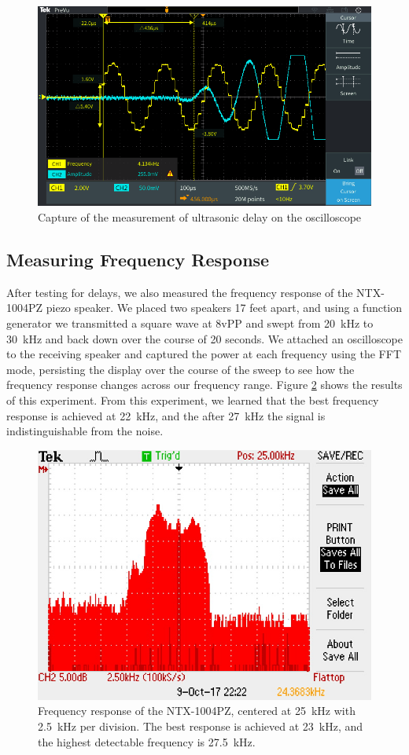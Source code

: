 \documentclass{article}
\begin{document}
    \begin{figure}[H]
      \centering
      \includegraphics[width=0.8\linewidth]{./images/us_delay_scope.png}
      \caption{Capture of the measurement of ultrasonic delay on the oscilloscope}
      \label{fig:us_delay_scope}
    \end{figure}

  \subsection{Measuring Frequency Response} \label{section:frequency_response}

    After testing for delays, we also measured the frequency response of the NTX-1004PZ piezo speaker. We placed two speakers 17 feet apart, and using a function generator we transmitted a square wave at 8vPP and swept from \SI{20}{\kilo\hertz} to \SI{30}{\kilo\hertz} and back down over the course of 20 seconds. We attached an oscilloscope to the receiving speaker and captured the power at each frequency using the FFT mode, persisting the display over the course of the sweep to see how the frequency response changes across our frequency range. Figure \ref{fig:frequency_response} shows the results of this experiment. From this experiment, we learned that the best frequency response is achieved at \SI{22}{\kilo\hertz}, and the after \SI{27}{\kilo\hertz} the signal is indistinguishable from the noise.

    \begin{figure}[H]
      \centering
      \includegraphics[width=0.7\linewidth]{./images/frequency_response.JPG}
      \caption{Frequency response of the NTX-1004PZ, centered at \SI{25}{\kilo\hertz} with \SI{2.5}{\kilo\hertz} per division. The best response is achieved at \SI{23}{\kilo\hertz}, and the highest detectable frequency is \SI{27.5}{\kilo\hertz}.}
      \label{fig:frequency_response}
    \end{figure}
\end{document}
